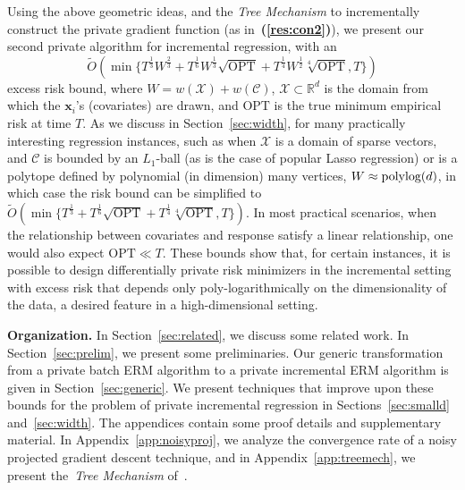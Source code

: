 \documentclass{article}
\theoremstyle{plain}
\newcommand{\resref}[1]{{\bf (\ref{res:#1})}}
\def \polylog{\mbox{\rm polylog}}
\def \CCC {\mathcal{C}}
\def \XXX {\mathcal{X}}
\def \OPT {{\mathrm{OPT}}}
\def \x {\mathbf x}
\def \R {\mathbb{R}}
\begin{document}
\begin{list}{{\bf ()}}{
\setlength{\leftmargin}{12pt}
\setlength{\listparindent}{\parindent}
\setlength{\parsep}{0pt}}
Using the above geometric ideas, and the \emph{Tree Mechanism} to incrementally construct the private gradient function (as in~\resref{con2}), we present our second private algorithm for incremental regression, with an 
$$\tilde{O}(\min\{T^{\frac 1 3}W^{\frac 2 3} + T^{\frac 1 6}W^{\frac 1 3}\sqrt{\OPT}+T^{\frac 1 4}W^{\frac 1 2}\sqrt[4]{\OPT},T\})$$ 
excess risk bound, where $W=w(\XXX)+w(\CCC)$, $\XXX \subset \R^d$ is the domain from which the $\x_i$'s (covariates) are drawn, and $\OPT$ is the true minimum empirical risk at time $T$. As we discuss in Section~\ref{sec:width}, for many practically interesting regression instances, such as when $\XXX$ is a domain of sparse vectors, and $\CCC$ is bounded by an $L_1$-ball (as is the case of popular Lasso regression) or is a polytope defined by polynomial (in dimension) many vertices, $W \approx \polylog(d)$, in which case the risk bound can be simplified to $\tilde{O}(\min\{T^{\frac 1 3} + T^{\frac 1 6}\sqrt{\OPT}+T^{\frac 1 4}\sqrt[4]{\OPT},T\})$. In most practical scenarios, when the relationship between covariates and response satisfy a linear relationship, one would also expect $\OPT \ll T$. 
These bounds show that, for certain instances, it is possible to design differentially private risk minimizers in the incremental setting with excess risk that depends only poly-logarithmically on the dimensionality of the data, a desired feature in a high-dimensional setting.
\end{list}

\noindent\textbf{Organization.} In Section~\ref{sec:related}, we discuss some related work. In Section~\ref{sec:prelim}, we present some preliminaries. Our generic transformation from a private batch ERM algorithm to a private incremental ERM algorithm is given in Section~\ref{sec:generic}. We present techniques that improve upon these bounds for the problem of private incremental regression in Sections~\ref{sec:smalld} and~\ref{sec:width}. The appendices contain some proof details and supplementary material. In Appendix~\ref{app:noisyproj}, we analyze the convergence rate of a noisy projected gradient descent technique, and in Appendix~\ref{app:treemech}, we present the~\emph{Tree Mechanism} of~\cite{DNPR10,CSS11}.
\end{document}
